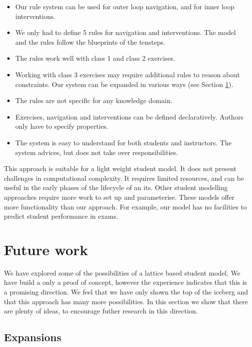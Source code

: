 \begin{itemize}
\item Our rule system can be used for outer loop navigation, and for inner loop interventions.
\item We only had to define 5 rules for navigation and interventions.
The model and the rules follow the blueprints of the \gls{tensteps}.
\item The rules work well with class 1 and class 2 exercises.
\item Working with class 3 exercises may require additional rules to reason about constraints.
Our system can be expanded in various ways (see Section \ref{sec:futwrok}).
\item The rules are not specific for any knowledge domain.
\item Exercises, navigation and interventions can be defined declaratively.
Authors only have to specify properties.
\item The system is easy to understand for both students and instructors.
The system advices, but does not take over responsibilities.
\end{itemize}

This approach is suitable for a light weight student model. 
It does not present challenges in computational complexity.
It requires limited resources, and can be useful in the early phases of the lifecycle of an \gls{its}.
Other student modelling  approaches \citep{corbett_1995} require more work to set up and parameterise.
These models offer more functionality than our approach.
For example, our model has no facilities to predict student performance in exams.



\section{Future work}
\label{sec:futwrok} 

We have explored some of the possibilities of a lattice based student model.
We have build a only a proof of concept, however the experience indicates that this is a promising direction.
We feel that we have only shown the top of the iceberg and that this approach has many more possibilities.
In this section we show that there are plenty of ideas, to encourage futher research in this direction.

\subsection{Expansions}



